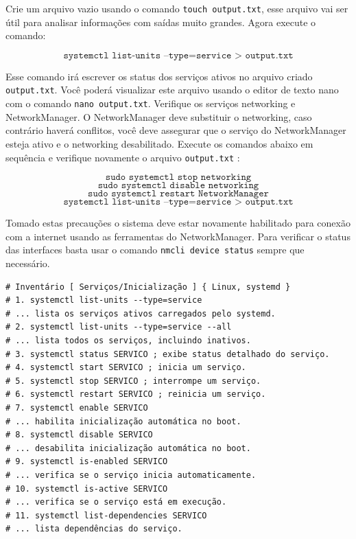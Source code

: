 \documentclass[12pt,a4paper]{article}
\begin{document}
Crie um arquivo vazio usando o comando \texttt{touch output.txt}, esse arquivo vai ser útil para analisar informações com saídas muito grandes. Agora execute o comando:

$$ \texttt{systemctl list-units --type=service > output.txt} $$

Esse comando irá escrever os status dos serviços ativos no arquivo criado \texttt{output.txt}. Você poderá visualizar este arquivo usando o editor de texto nano com o comando \texttt{nano output.txt}. Verifique os serviços networking e NetworkManager. O NetworkManager deve substituir o networking, caso contrário haverá conflitos, você deve assegurar que o serviço do NetworkManager esteja ativo e o networking desabilitado. Execute os comandos abaixo em sequência e verifique novamente o arquivo \texttt{output.txt} :

$$ \texttt{sudo systemctl stop networking} $$
$$ \texttt{sudo systemctl disable networking} $$
$$ \texttt{sudo systemctl restart NetworkManager} $$
$$ \texttt{systemctl list-units --type=service > output.txt} $$

\vspace{\baselineskip}

Tomado estas precauções o sistema deve estar novamente habilitado para conexão com a internet usando as ferramentas do NetworkManager. Para verificar o status das interfaces basta usar o comando \texttt{nmcli device status} sempre que necessário. \\

\begin{lstlisting}
# Inventário [ Serviços/Inicialização ] { Linux, systemd }
# 1. systemctl list-units --type=service
# ... lista os serviços ativos carregados pelo systemd.
# 2. systemctl list-units --type=service --all 
# ... lista todos os serviços, incluindo inativos.
# 3. systemctl status SERVICO ; exibe status detalhado do serviço.
# 4. systemctl start SERVICO ; inicia um serviço.
# 5. systemctl stop SERVICO ; interrompe um serviço.
# 6. systemctl restart SERVICO ; reinicia um serviço.
# 7. systemctl enable SERVICO 
# ... habilita inicialização automática no boot.
# 8. systemctl disable SERVICO 
# ... desabilita inicialização automática no boot.
# 9. systemctl is-enabled SERVICO 
# ... verifica se o serviço inicia automaticamente.
# 10. systemctl is-active SERVICO 
# ... verifica se o serviço está em execução.
# 11. systemctl list-dependencies SERVICO 
# ... lista dependências do serviço.
\end{lstlisting}
\end{document}
